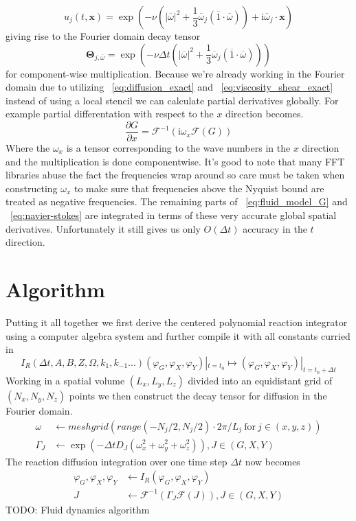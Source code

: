 \documentclass{article}
\begin{document}
\begin{equation}
u_j(t, \mathbf{x}) = \exp \left (-\nu \left (|\overline \omega|^2 + \frac{1}{3} \overline \omega_j (\overline 1 \cdot \overline \omega) \right) + \mathrm i \overline \omega_j \cdot \mathbf x \right)
\end{equation}
giving rise to the Fourier domain decay tensor
\begin{equation}
\mathbf \Theta_{j, \overline \omega} = \exp \left (-\nu \Delta t \left(|\overline{\omega}|^2 + \frac{1}{3} \overline \omega_j (\overline 1 \cdot \overline \omega) \right) \right) \label{eq:viscosity_shear_exact}
\end{equation}
for component-wise multiplication.
Because we're already working in the Fourier domain due to utilizing ~\ref{eq:diffusion_exact} and ~\ref{eq:viscosity_shear_exact} instead of using a local stencil we can calculate partial derivatives globally. For example partial differentation with respect to the $x$ direction becomes.
\begin{equation}
\frac{\partial G}{\partial x} = \mathcal F^{-1} \left(\mathrm i \omega_x \mathcal F (G)\right)
\end{equation}
Where the $\omega_x$ is a tensor corresponding to the wave numbers in the $x$ direction and the multiplication is done componentwise. It's good to note that many FFT libraries abuse the fact the frequencies wrap around so care must be taken when constructing $\omega_x$ to make sure that frequencies above the Nyquist bound are treated as negative frequencies.
The remaining parts of ~\ref{eq:fluid_model_G} and ~\ref{eq:navier-stokes} are integrated in terms of these very accurate global spatial derivatives. Unfortunately it still gives us only $O(\Delta t)$ accuracy in the $t$ direction.
\section{Algorithm}
Putting it all together we first derive the centered polynomial reaction integrator using a computer algebra system and further compile it with all constants curried in
\begin{equation}
I_{R}(\Delta t, A, B, Z, \Omega, k_1, k_{-1} ...)(\varphi_G, \varphi_X, \varphi_Y)|_{t=t_0} \mapsto \left ( \varphi_G, \varphi_X, \varphi_Y \right)|_{t=t_0+\Delta t}
\end{equation}
Working in a spatial volume $(L_x, L_y, L_z)$ divided into an equidistant grid of $(N_x, N_y, N_z)$ points we then construct the decay tensor for diffusion in the Fourier domain.
\begin{align}
\omega &\leftarrow meshgrid(range(-N_j/2, N_j/2) \cdot 2 \pi / L_j \  \mathrm{for} \ j \in (x, y, z)) \\
\Gamma_J &\leftarrow \exp \left(-\Delta t D_J (\omega_x^2 + \omega_y^2 + \omega_z^2) \right), J \in (G, X, Y)
\end{align}
The reaction diffusion integration over one time step $\Delta t$ now becomes
\begin{align}
\varphi_G, \varphi_X, \varphi_Y &\leftarrow I_R(\varphi_G, \varphi_X, \varphi_Y) \\
J &\leftarrow \mathcal F^{-1} \left(\Gamma_J \mathcal F(J)\right), J \in (G, X, Y)
\end{align}
TODO: Fluid dynamics algorithm
\end{document}
